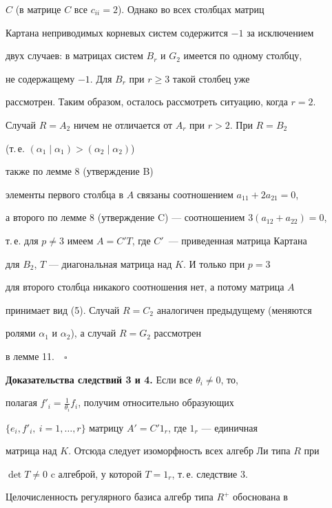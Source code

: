 $C$ (в матрице $C$ все $c_{ii}=2$). Однако во всех столбцах матриц


Картана неприводимых корневых систем содержится $-1$ за исключением


двух случаев: в матрицах систем $B_r$ и $G_2$ имеется по одному столбцу,


не содержащему $-1$. Для $B_r$ при $r\ge 3$ такой столбец уже


рассмотрен. Таким образом, осталось рассмотреть ситуацию, когда $r=2$.





Случай $R=A_2$ ничем не отличается от $A_r$ при $r>2$. При $R=B_2$


(т.\,е. $(\alpha_1\mid \alpha_1)>(\alpha_2\mid \alpha_2)$)


также по лемме 8 (утверждение B)


элементы первого столбца в $A$ связаны соотношением $a_{11}+2a_{21}=0$,


а второго по лемме 8 (утверждение C) --- соотношением $3(a_{12}+a_{22})=0$,


т.\,е. для $p\ne 3$ имеем $A=C'T$, где $C'$~--- приведенная матрица Картана


для $B_2$, $T$ --- диагональная матрица над $K$. И только при $p=3$


для второго столбца никакого соотношения нет, а потому матрица $A$


принимает вид (5). Случай $R=C_2$ аналогичен предыдущему (меняются


ролями $\alpha_1$ и $\alpha_2$), а случай $R=G_2$ рассмотрен


в лемме 11.$\quad\square$


\medskip





{\bf Доказательства следствий 3 и 4.} Если все $\theta_i\ne0$, то,


полагая $f'_i=\frac1{\theta_i}f_i$, получим относительно образующих


$\{e_i,f'_i,\ i=1,\dotsc,r\}$ матрицу $A'=C'1_r$, где $1_r$ --- единичная


матрица над $K$. Отсюда следует изоморфность всех алгебр Ли типа $R$ при


$\det T\ne0$ c алгеброй, у которой $T=1_r$, т.\,е. следствие 3.





Целочисленность регулярного базиса алгебр типа $R^+$ обоснована в


